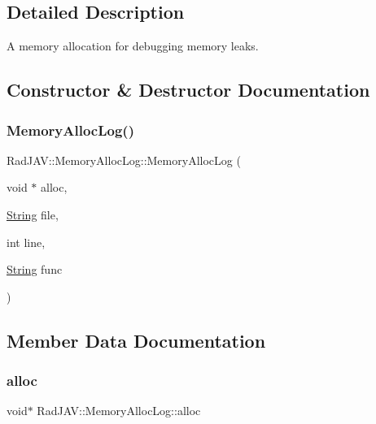 \subsection{Detailed Description}
A memory allocation for debugging memory leaks. 

\subsection{Constructor \& Destructor Documentation}
\mbox{\label{class_rad_j_a_v_1_1_memory_alloc_log_a8c53e87a22849fe197eb32c3f3f8d7cb}} 
\subsubsection{\texorpdfstring{Memory\+Alloc\+Log()}{MemoryAllocLog()}}
{\footnotesize\ttfamily Rad\+J\+A\+V\+::\+Memory\+Alloc\+Log\+::\+Memory\+Alloc\+Log (\begin{DoxyParamCaption}\item[{void $\ast$}]{alloc,  }\item[{\mbox{\hyperlink{class_rad_j_a_v_1_1_string}{String}}}]{file,  }\item[{int}]{line,  }\item[{\mbox{\hyperlink{class_rad_j_a_v_1_1_string}{String}}}]{func }\end{DoxyParamCaption})\hspace{0.3cm}{\ttfamily [inline]}}



\subsection{Member Data Documentation}
\mbox{\label{class_rad_j_a_v_1_1_memory_alloc_log_a5b0962bf8bcffef546a65b2a6372b71b}} 
\subsubsection{\texorpdfstring{alloc}{alloc}}
{\footnotesize\ttfamily void$\ast$ Rad\+J\+A\+V\+::\+Memory\+Alloc\+Log\+::alloc}

